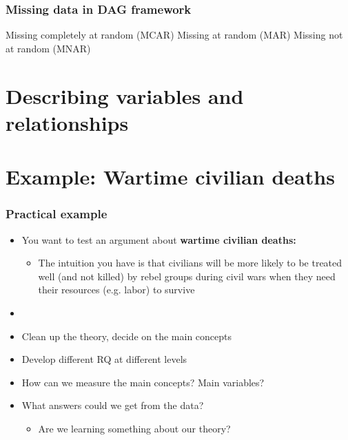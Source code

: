 \documentclass[aspectratio=43]{beamer}
\begin{document}
\begin{frame}
\frametitle{Missing data in DAG framework}
\centering

Missing completely at random (MCAR)
Missing at random (MAR)
Missing not at random (MNAR)

\end{frame}

\section{Describing variables and relationships}


\section{Example: Wartime civilian deaths}

\begin{frame}
\frametitle{Practical example}
\centering

\begin{itemize}
  \item You want to test an argument about \textbf{wartime civilian deaths:}
  \begin{itemize}
    \item The intuition you have is that civilians will be more likely to be treated well (and not killed) by rebel groups during civil wars when they need their resources (e.g. labor) to survive
  \end{itemize}
  \item[]
  \item Clean up the theory, decide on the main concepts
  \item Develop different RQ at different levels
  \item How can we measure the main concepts? Main variables?
  \item What answers could we get from the data?
    \begin{itemize}
      \item Are we learning something about our theory?
    \end{itemize}
\end{itemize}

\end{frame}



\end{document}
